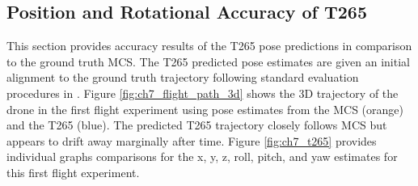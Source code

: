 \begin{table}[H]
\centering
\caption{Mean and Standard Deviation of Execution Times (ms)}\label{table:ch7_execution_time}
\end{table}


\subsection{Position and Rotational Accuracy of T265}\label{sec:ch7_results_t265_accuracy}


This section provides accuracy results of the T265 pose predictions in comparison to the ground truth \ac{MCS}. The T265 predicted pose estimates are given an initial alignment to the ground truth trajectory following standard evaluation procedures in \cite{zhang_tutorial_2018}. Figure \ref{fig:ch7_flight_path_3d} shows the 3D trajectory of the drone in the first flight experiment using pose estimates from the \ac{MCS} (orange) and the T265 (blue). The predicted T265 trajectory closely follows \ac{MCS} but appears to drift away marginally after time. Figure \ref{fig:ch7_t265} provides individual graphs comparisons for the x, y, z, roll, pitch, and yaw estimates for this first flight experiment.

